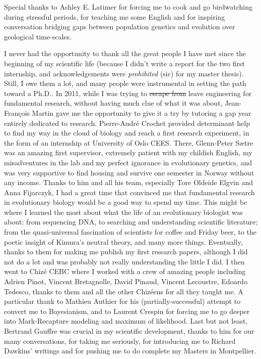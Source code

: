 Special thanks to Ashley E. Latimer for forcing me to cook and go birdwatching during stressful periods, for teaching me some English and for inspiring conversation bridging gaps between population genetics and evolution over geological time-scales. 

I never had the opportunity to thank all the great people I have met since the beginning of my scientific life (because I didn't write a report for the two first internship, and acknowledgements were \textit{prohibited} (sic) for my master thesis). Still, I owe them a lot, and many people were instrumental in setting the path toward a Ph.D.. 
In 2011, while I was trying to \sout{escape from} leave engineering for fundamental research, without having much clue of what it was about, Jean-Fran\c{c}ois Martin gave me the opportunity to give it a try by tutoring a gap year entirely dedicated to research. Pierre-Andr\'{e} Crochet provided determinant help to find my way in the cloud of biology and reach a first research experiment, in the form of an internship at University of Oslo CEES. There, Glenn-Peter S{\ae}tre was an amazing first supervisor, extremely patient with my childish English, my misadventures in the lab and my perfect ignorance in evolutionary genetics, and was very supportive to find housing and survive one semester in Norway without any income. Thanks to him and all his team, especially Tore Oldeide Elgvin and Anna Fijarczyk, I had a great time that convinced me that fundamental research in evolutionary biology would be a good way to spend my time. This might be where I learned the most about what the life of an evolutionary biologist was about: from sequencing DNA, to searching and understanding scientific literature; from the quasi-universal fascination of scientists for coffee and Friday beer, to the poetic insight of Kimura's neutral theory, and many more things. Eventually, thanks to them for making me publish my first research papers, although I did not do a lot and was probably not really understanding the little I did. 
I then went to Chiz\'{e} CEBC where I worked with a crew of amazing people including Adrien Pinot, Vincent Bretagnolle, David Pinaud, Vincent Lecoustre, Edoardo Tedesco, thanks to them and all the other Chiz\'eens for all they taught me. A particular thank to Mathieu Authier for his (partially-successful) attempt to convert me to Bayesianism, and to Laurent Crespin for forcing me to go deeper into Mark-Recapture modeling and maximum of likelihood. Last but not least, Bertrand Gauffre was crucial in my scientific development, thanks to him for our many conversations, for taking me seriously, for introducing me to Richard Dawkins' writings and for pushing me to do complete my Masters in Montpellier. 
